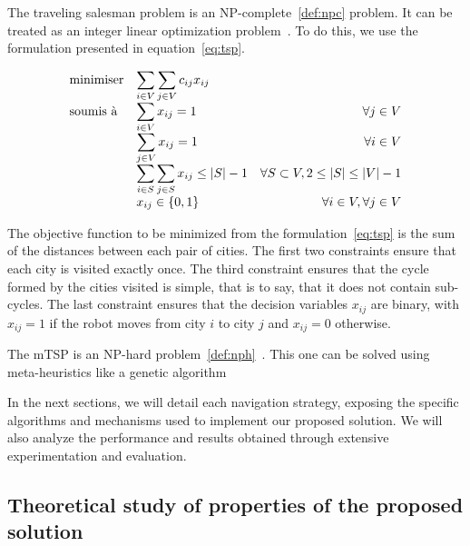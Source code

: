 \documentclass[english,RandD]{rapportPFE}  %
\begin{document}
				The traveling salesman problem is an NP-complete~\ref{def:npc} problem.
				It can be treated as an integer linear optimization problem~\cite{article244, gurobi25}.
				To do this, we use the formulation presented in equation~\ref{eq:tsp}.

				\begin{equation}
					\label{eq:tsp}
					\begin{array}{ll@{}rr}
						\text{minimiser} &
						\displaystyle\sum\limits_{i \in V} \sum\limits_{j \in V} c_{ij} x_{ij} &
						&
						\\
						\text{soumis à} &
						\displaystyle\sum\limits_{i \in V} x_{ij} = 1 &
						&
						\forall j \in V \\
						&
						\displaystyle\sum\limits_{j \in V} x_{ij} = 1 &
						&
						\forall i \in V \\
						&
						\displaystyle\sum\limits_{i \in S} \sum\limits_{j \in S} x_{ij} \leq |S| - 1 &
						&
						\forall S \subset V, 2 \leq |S| \leq |V| - 1 \\
						&
						x_{ij} \in \{0, 1\} &
						&
						\forall i \in V, \forall j \in V \\
					\end{array}
				\end{equation}

				The objective function to be minimized from the formulation~\ref{eq:tsp} is the sum of the distances between each pair of cities.
				The first two constraints ensure that each city is visited exactly once.
				The third constraint ensures that the cycle formed by the cities visited is simple, that is to say, that it does not contain sub-cycles.
				The last constraint ensures that the decision variables $x_{ij}$ are binary, with $x_{ij} = 1$ if the robot moves from city $i$ to city $j$ and $x_{ij} = 0$ otherwise.

				The mTSP is an NP-hard problem~\ref{def:nph}~\cite{SUNDAR201639}.
				This one can be solved using meta-heuristics like a genetic algorithm~\cite{SinghMTSP, Kiraly2011}

				In the next sections, we will detail each navigation strategy, exposing the specific algorithms and mechanisms used to implement our proposed solution. We will also analyze the performance and results obtained through extensive experimentation and evaluation.
		\subsection{Theoretical study of properties of the proposed solution}
\end{document}
